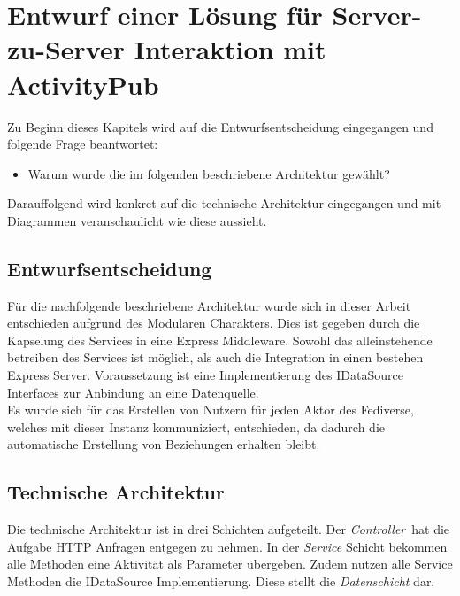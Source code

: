 \chapter{Entwurf einer Lösung für Server-zu-Server Interaktion mit ActivityPub}
	Zu Beginn dieses Kapitels wird auf die Entwurfsentscheidung eingegangen und folgende Frage beantwortet:
	\begin{itemize}
		\item Warum wurde die im folgenden beschriebene Architektur gewählt?
	\end{itemize}
	Darauffolgend wird konkret auf die technische Architektur eingegangen und mit Diagrammen veranschaulicht wie diese aussieht.
\section{Entwurfsentscheidung}
	Für die nachfolgende beschriebene Architektur wurde sich in dieser Arbeit entschieden aufgrund des Modularen Charakters. Dies ist gegeben durch die Kapselung des Services in eine Express Middleware. Sowohl das alleinstehende betreiben des Services ist möglich, als auch die Integration in einen bestehen Express Server. Voraussetzung ist eine Implementierung des IDataSource Interfaces zur Anbindung an eine Datenquelle.\\
	
	Es wurde sich für das Erstellen von Nutzern für jeden Aktor des Fediverse, welches mit dieser Instanz kommuniziert, entschieden, da dadurch die automatische Erstellung von Beziehungen erhalten bleibt.
\section{Technische Architektur}
	Die technische Architektur ist in drei Schichten aufgeteilt. Der \textit{ Controller}~hat die Aufgabe HTTP Anfragen entgegen zu nehmen. In der \textit{Service} Schicht bekommen alle Methoden eine Aktivität als Parameter übergeben. Zudem nutzen alle Service Methoden die IDataSource Implementierung. Diese stellt die \textit{Datenschicht} dar.\\
	
